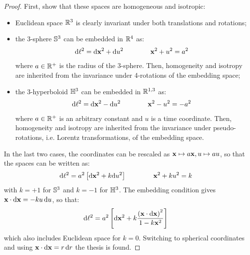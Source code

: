 \begin{proofbox}
  \begin{proof}
    First, show that these spaces are homogeneous and isotropic:
    \begin{itemize}
      \item Euclidean space $ \mathbb{R}^3 $ is clearly invariant under both translations and rotations;
      \item the 3-sphere $ \mathbb{S}^{3} $ can be embedded in $ \mathbb{R}^4 $ as:
        \begin{equation*}
          \mathrm{d} \ell^2 = \mathrm{d} \mathbf{x}^2 + \mathrm{d} u^2
          \qquad \qquad
          \mathbf{x}^2 + u^2 = a^2
        \end{equation*}
        where $ a \in \mathbb{R}^+ $ is the radius of the 3-sphere. Then, homogeneity and isotropy are inherited from the invariance under 4-rotations of the embedding space;
      \item the 3-hyperboloid $ \mathbb{H}^{3} $ can be embedded in $ \mathbb{R}^{1,3} $ as:
        \begin{equation*}
          \mathrm{d} \ell^2 = \mathrm{d} \mathbf{x}^2 - \mathrm{d} u^2
          \qquad \qquad
          \mathbf{x}^2 - u^2 = - a^2
        \end{equation*}
        where $ a \in \mathbb{R}^+ $ is an arbitrary constant and $ u $ is a time coordinate. Then, homogeneity and isotropy are inherited from the invariance under pseudo-rotations, i.e. Lorentz transformations, of the embedding space.
    \end{itemize}
    In the last two cases, the coordinates can be rescaled as $ \mathbf{x} \mapsto a \mathbf{x} , u \mapsto a u $, so that the spaces can be written as:
    \begin{equation*}
      \mathrm{d} \ell^2 = a^2 \left[ \mathrm{d} \mathbf{x}^2 + k \mathrm{d} u^2 \right]
      \qquad \qquad
      \mathbf{x}^2 + k u^2 = k
    \end{equation*}
    with $ k = + 1 $ for $ \mathbb{S}^{3} $ and $ k = -1 $ for $ \mathbb{H}^{3} $. The embedding condition gives $ \mathbf{x} \cdot \mathrm{d} \mathbf{x} = - k u \, \mathrm{d} u $, so that:
    \begin{equation*}
      \mathrm{d} \ell^2 = a^2 \left[ \mathrm{d} \mathbf{x}^2 + k \frac{\left( \mathbf{x} \cdot \mathrm{d} \mathbf{x} \right)^2}{1 - k \mathbf{x}^2} \right]
    \end{equation*}
    which also includes Euclidean space for $ k = 0 $. Switching to spherical coordinates and using $ \mathbf{x} \cdot \mathrm{d} \mathbf{x} = r \, \mathrm{d} r $ the thesis is found.
  \end{proof}
\end{proofbox}

